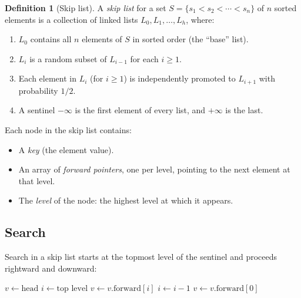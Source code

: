 \documentclass[twoside,12pt]{book}
\theoremstyle{plain}
\theoremstyle{definition}
\newtheorem{definition}[theorem]{Definition}
\theoremstyle{remark}
\begin{document}
\begin{definition}[Skip list]
A \emph{skip list} for a set $S = \{s_1 < s_2 < \cdots < s_n\}$ of $n$ sorted elements is a collection of linked lists $L_0, L_1, \ldots, L_h$, where:
\begin{enumerate}[nosep]
    \item $L_0$ contains all $n$ elements of $S$ in sorted order (the ``base'' list).
    \item $L_i$ is a random subset of $L_{i-1}$ for each $i \geq 1$.
    \item Each element in $L_i$ (for $i \geq 1$) is independently promoted to $L_{i+1}$ with probability $1/2$.
    \item A sentinel $-\infty$ is the first element of every list, and $+\infty$ is the last.
\end{enumerate}
\end{definition}

Each node in the skip list contains:
\begin{itemize}[nosep]
    \item A \emph{key} (the element value).
    \item An array of \emph{forward pointers}, one per level, pointing to the next element at that level.
    \item The \emph{level} of the node: the highest level at which it appears.
\end{itemize}

\subsection{Search}

Search in a skip list starts at the topmost level of the sentinel and proceeds rightward and downward:

\begin{algorithm}[H]
\caption{Skip List Search}
\begin{algorithmic}[1]
    \State $v \gets \text{head}$
    \State $i \gets \text{top level}$
            \State $v \gets v.\text{forward}[i]$
        \EndWhile
        \State $i \gets i - 1$
    \EndWhile
    \State $v \gets v.\text{forward}[0]$
        \State {}
    \Else
        \State {}
    \EndIf
\EndFunction
\end{algorithmic}
\end{algorithm}
\end{document}

